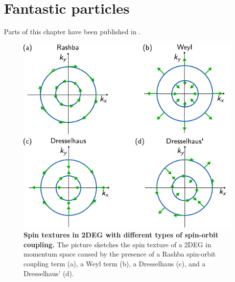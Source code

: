 \documentclass[../main]{subfiles}
\begin{document}
\chapter{Fantastic particles}
\label{ch:ch2}

\vfill
\begin{disclaimer}
Parts of this chapter have been published in .
\end{disclaimer}

\clearpage

\lipsum[1-10]

\begin{figure}[hbtp]
    \centering
    \includegraphics{ch2/img/spin_textures.pdf}
    \caption{\textbf{Spin textures in 2DEG with different types of spin-orbit coupling.}
    The picture sketches the spin texture of a 2DEG in momentum space caused by the presence of a Rashba spin-orbit coupling term (a), a Weyl term (b), a Dresselhaus (c), and a Dresselhaus' (d).
    }
    \label{fig:spin_textures}
\end{figure}

\lipsum[11-13]

\ifSubfilesClassLoaded{%
\printbibliography
}{}
\end{document}
